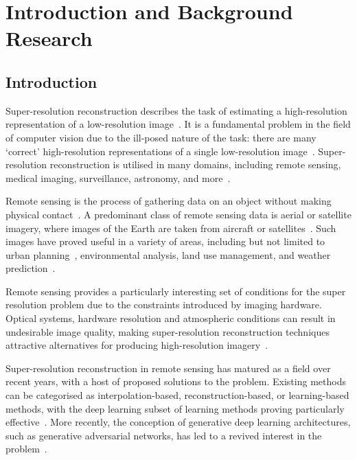 \chapter{Introduction and Background Research}\label{chapter1}
\section{Introduction}

Super-resolution reconstruction describes the task of estimating a high-resolution representation of a low-resolution image~\cite{superResOverview}. It is a fundamental problem in the field of computer vision due to the ill-posed nature of the task: there are many `correct' high-resolution representations of a single low-resolution image~\cite{superResChallenges,superResRemoteSensingOverview}. Super-resolution reconstruction is utilised in many domains, including remote sensing, medical imaging, surveillance, astronomy, and more~\cite{superResRemoteSensingChallenges, superResRemoteSensingOverview, superResMedicalImaging, superResSurveillance, superResAstronomy, superResUses}.

Remote sensing is the process of gathering data on an object without making physical contact~\cite{remoteSensing}. A predominant class of remote sensing data is aerial or satellite imagery, where images of the Earth are taken from aircraft or satellites~\cite{remoteSensing,remoteSensingImageProcessing}. Such images have proved useful in a variety of areas, including but not limited to urban planning~\cite{remoteSensingUses}, environmental analysis, land use management, and weather prediction~\cite{remoteSensingGANsReview}.

Remote sensing provides a particularly interesting set of conditions for the super resolution problem due to the constraints introduced by imaging hardware. Optical systems, hardware resolution and atmospheric conditions can result in undesirable image quality, making super-resolution reconstruction techniques attractive alternatives for producing high-resolution imagery~\cite{superResRemoteSensingOverview,superResRemoteSensingChallenges, remoteSensingDeepLearningReview, remoteSensingGANsReview}.

Super-resolution reconstruction in remote sensing has matured as a field over recent years, with a host of proposed solutions to the problem. Existing methods can be categorised as interpolation-based, reconstruction-based, or learning-based methods, with the deep learning subset of learning methods proving particularly effective~\cite{superResRemoteSensingOverview,srcnn,vdsr}. More recently, the conception of generative deep learning architectures, such as generative adversarial networks, has led to a revived interest in the problem~\cite{srgan,esrgan,isrgan,tesagan,ndsrgan}.

